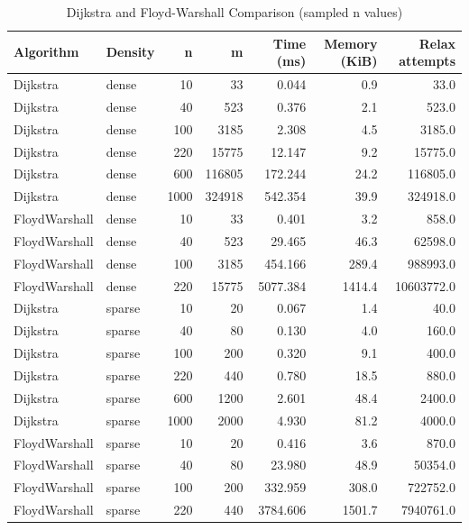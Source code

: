 \begin{table}[H]
\centering
\caption{Dijkstra and Floyd-Warshall Comparison (sampled n values)}
\small
\begin{tabular}{llrrrrr}
\toprule
Algorithm & Density & n & m & Time (ms) & Memory (KiB) & Relax attempts\\
\midrule
Dijkstra & dense & 10 & 33 & 0.044 & 0.9 & 33.0\\
Dijkstra & dense & 40 & 523 & 0.376 & 2.1 & 523.0\\
Dijkstra & dense & 100 & 3185 & 2.308 & 4.5 & 3185.0\\
Dijkstra & dense & 220 & 15775 & 12.147 & 9.2 & 15775.0\\
Dijkstra & dense & 600 & 116805 & 172.244 & 24.2 & 116805.0\\
Dijkstra & dense & 1000 & 324918 & 542.354 & 39.9 & 324918.0\\
FloydWarshall & dense & 10 & 33 & 0.401 & 3.2 & 858.0\\
FloydWarshall & dense & 40 & 523 & 29.465 & 46.3 & 62598.0\\
FloydWarshall & dense & 100 & 3185 & 454.166 & 289.4 & 988993.0\\
FloydWarshall & dense & 220 & 15775 & 5077.384 & 1414.4 & 10603772.0\\
Dijkstra & sparse & 10 & 20 & 0.067 & 1.4 & 40.0\\
Dijkstra & sparse & 40 & 80 & 0.130 & 4.0 & 160.0\\
Dijkstra & sparse & 100 & 200 & 0.320 & 9.1 & 400.0\\
Dijkstra & sparse & 220 & 440 & 0.780 & 18.5 & 880.0\\
Dijkstra & sparse & 600 & 1200 & 2.601 & 48.4 & 2400.0\\
Dijkstra & sparse & 1000 & 2000 & 4.930 & 81.2 & 4000.0\\
FloydWarshall & sparse & 10 & 20 & 0.416 & 3.6 & 870.0\\
FloydWarshall & sparse & 40 & 80 & 23.980 & 48.9 & 50354.0\\
FloydWarshall & sparse & 100 & 200 & 332.959 & 308.0 & 722752.0\\
FloydWarshall & sparse & 220 & 440 & 3784.606 & 1501.7 & 7940761.0\\
\bottomrule
\end{tabular}
\end{table}
